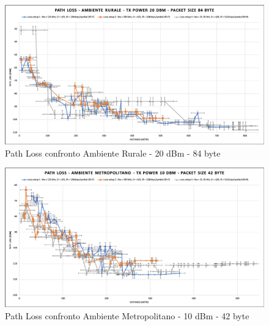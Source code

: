 \documentclass[12pt,a4paper,openright,twoside]{report}
\begin{document}
\begin{figure}[h]                      
\begin{center} 
\includegraphics[width=\textwidth]{PATH_LOSS_confronto_AR_20dBm_84byte.png}
\caption[Path Loss confronto Ambiente Rurale - 20 dBm - 84 byte]{Path Loss confronto Ambiente Rurale - 20 dBm - 84 byte}\label{fig:prima}
\end{center}
\end{figure}

\begin{figure}[h]                      
\begin{center} 
\includegraphics[width=\textwidth]{PATH_LOSS_confronto_AM_10dBm_42byte.png}
\caption[Path Loss confronto Ambiente Metropolitano - 10 dBm - 42 byte]{Path Loss confronto Ambiente Metropolitano - 10 dBm - 42 byte}\label{fig:prima}
\end{center}
\end{figure}
\end{document}
